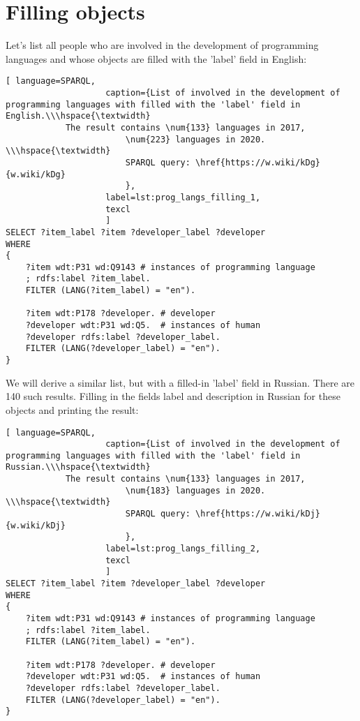 \section{Filling objects}

Let's list all people who are involved in the development of programming languages and whose objects are filled with the 'label' field in English:

\begin{lstlisting}[ language=SPARQL, 
                    caption={List of involved in the development of programming languages with filled with the 'label' field in English.\\\hspace{\textwidth}
			The result contains \num{133} languages in 2017, 
                        \num{223} languages in 2020. \\\hspace{\textwidth}
                        SPARQL query: \href{https://w.wiki/kDg}{w.wiki/kDg}
                        },
                    label=lst:prog_langs_filling_1,
                    texcl 
                    ]
SELECT ?item_label ?item ?developer_label ?developer
WHERE
{
    ?item wdt:P31 wd:Q9143 # instances of programming language
    ; rdfs:label ?item_label. 
    FILTER (LANG(?item_label) = "en"). 

    ?item wdt:P178 ?developer. # developer 
    ?developer wdt:P31 wd:Q5.  # instances of human
    ?developer rdfs:label ?developer_label. 
    FILTER (LANG(?developer_label) = "en").  
}
\end{lstlisting}%

We will derive a similar list, but with a filled-in 'label' field in Russian. There are 140 such results. Filling in the fields label and description in Russian for these objects and printing the result:

\begin{lstlisting}[ language=SPARQL, 
                    caption={List of involved in the development of programming languages with filled with the 'label' field in Russian.\\\hspace{\textwidth}
			The result contains \num{133} languages in 2017, 
                        \num{183} languages in 2020. \\\hspace{\textwidth}
                        SPARQL query: \href{https://w.wiki/kDj}{w.wiki/kDj}
                        },
                    label=lst:prog_langs_filling_2,
                    texcl 
                    ]
SELECT ?item_label ?item ?developer_label ?developer
WHERE
{
    ?item wdt:P31 wd:Q9143 # instances of programming language
    ; rdfs:label ?item_label. 
    FILTER (LANG(?item_label) = "en"). 

    ?item wdt:P178 ?developer. # developer 
    ?developer wdt:P31 wd:Q5.  # instances of human
    ?developer rdfs:label ?developer_label. 
    FILTER (LANG(?developer_label) = "en").  
}
\end{lstlisting}%

